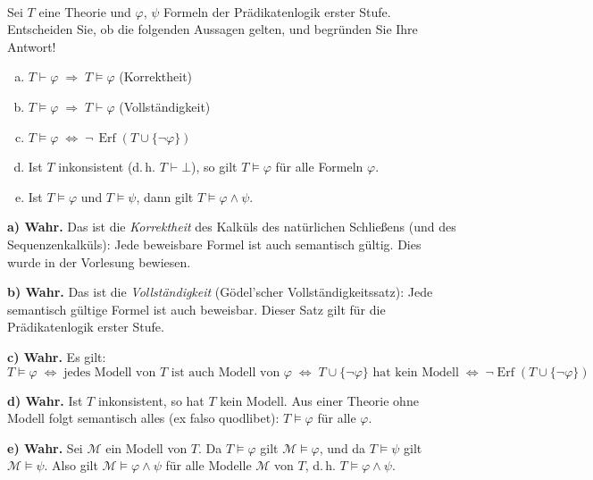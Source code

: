 \\
Sei $T$ eine Theorie und $\varphi$, $\psi$ Formeln der Prädikatenlogik erster Stufe.
Entscheiden Sie, ob die folgenden Aussagen gelten, und begründen Sie Ihre Antwort!
\begin{enumerate}[a)]
  \item $T \vdash \varphi \;\Rightarrow\; T \models \varphi$ \quad (Korrektheit)
  \item $T \models \varphi \;\Rightarrow\; T \vdash \varphi$ \quad (Vollständigkeit)
  \item $T \models \varphi \;\Longleftrightarrow\; \neg\,\operatorname{Erf}(T \cup \{\neg\varphi\})$
  \item Ist $T$ inkonsistent (d.\,h. $T \vdash \bot$), so gilt $T \models \varphi$ für alle Formeln $\varphi$.
  \item Ist $T \models \varphi$ und $T \models \psi$, dann gilt $T \models \varphi \wedge \psi$.
\end{enumerate}

\begin{loesung}
\textbf{a) Wahr.} Das ist die \textit{Korrektheit} des Kalküls des natürlichen Schließens (und des Sequenzenkalküls): Jede beweisbare Formel ist auch semantisch gültig. Dies wurde in der Vorlesung bewiesen.

\textbf{b) Wahr.} Das ist die \textit{Vollständigkeit} (Gödel'scher Vollständigkeitssatz): Jede semantisch gültige Formel ist auch beweisbar. Dieser Satz gilt für die Prädikatenlogik erster Stufe.

\textbf{c) Wahr.} Es gilt:
\[
  T\models\varphi \;\Leftrightarrow\; \text{jedes Modell von }T\text{ ist auch Modell von }\varphi \;\Leftrightarrow\; T\cup\{\neg\varphi\}\text{ hat kein Modell} \;\Leftrightarrow\; \neg\operatorname{Erf}(T\cup\{\neg\varphi\})
\]

\textbf{d) Wahr.} Ist $T$ inkonsistent, so hat $T$ kein Modell. Aus einer Theorie ohne Modell folgt semantisch alles (ex falso quodlibet): $T\models\varphi$ für alle $\varphi$.

\textbf{e) Wahr.} Sei $\mathcal{M}$ ein Modell von $T$. Da $T\models\varphi$ gilt $\mathcal{M}\models\varphi$, und da $T\models\psi$ gilt $\mathcal{M}\models\psi$. Also gilt $\mathcal{M}\models\varphi\wedge\psi$ für alle Modelle $\mathcal{M}$ von $T$, d.\,h. $T\models\varphi\wedge\psi$.
\end{loesung}

